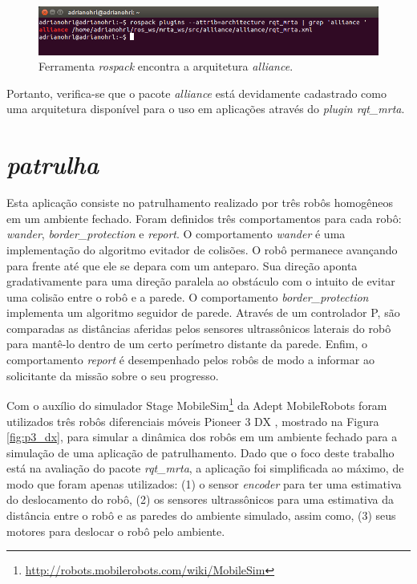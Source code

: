             \begin{figure}[htb]
                \centering
                \includegraphics[width=.95\textwidth]{Figuras/4_resultados/rqt_mrta_alliance.png}
                \caption{Ferramenta \textit{rospack} encontra a arquitetura \textit{alliance}.} \label{fig:rospack_alliance}
            \end{figure}
            
            Portanto, verifica-se que o pacote \textit{alliance} está devidamente cadastrado como uma arquitetura disponível para o uso em aplicações através do \textit{plugin rqt\_mrta}.
        
    \section{\textit{patrulha}} \label{sec:patrulha}
        Esta aplicação consiste no patrulhamento realizado por três robôs homogêneos em um ambiente fechado. Foram definidos três comportamentos para cada robô: \textit{wander}, \textit{border\_protection} e \textit{report}. O comportamento \textit{wander} é uma implementação do algoritmo evitador de colisões. O robô permanece avançando para frente até que ele se depara com um anteparo. Sua direção aponta gradativamente para uma direção paralela ao obstáculo com o intuito de evitar uma colisão entre o robô e a parede. O comportamento \textit{border\_protection} implementa um algoritmo seguidor de parede. Através de um controlador P, são comparadas as distâncias aferidas pelos sensores ultrassônicos laterais do robô para mantê-lo dentro de um certo perímetro distante da parede. Enfim, o comportamento \textit{report} é desempenhado pelos robôs de modo a informar ao solicitante da missão sobre o seu progresso.
            
        Com o auxílio do simulador Stage MobileSim\footnote{\url{http://robots.mobilerobots.com/wiki/MobileSim}} da Adept MobileRobots foram utilizados três robôs diferenciais móveis Pioneer 3 DX \cite{ref:adept2011p3dx}, mostrado na Figura \ref{fig:p3_dx}, para simular a dinâmica dos robôs em um ambiente fechado para a simulação de uma aplicação de patrulhamento. Dado que o foco deste trabalho está na avaliação do pacote \textit{rqt\_mrta}, a aplicação foi simplificada ao máximo, de modo que foram apenas utilizados: (1) o sensor \textit{encoder} para ter uma estimativa do deslocamento do robô, (2) os sensores ultrassônicos para uma estimativa da distância entre o robô e as paredes do ambiente simulado, assim como, (3) seus motores para deslocar o robô pelo ambiente. %
        
